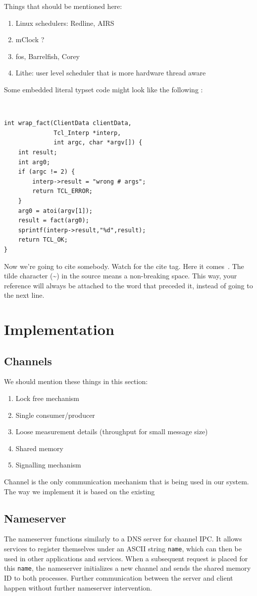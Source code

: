 \documentclass[letterpaper,twocolumn,10pt]{article}
\begin{document}
Things that should be mentioned here:
\begin{enumerate}
\item Linux schedulers: Redline, AIRS
\item mClock ?
\item fos, Barrelfish, Corey
\item Lithe: user level scheduler that is more hardware thread aware
\end{enumerate}

Some embedded literal typset code might 
look like the following :

{\tt \small
\begin{verbatim}
int wrap_fact(ClientData clientData,
              Tcl_Interp *interp,
              int argc, char *argv[]) {
    int result;
    int arg0;
    if (argc != 2) {
        interp->result = "wrong # args";
        return TCL_ERROR;
    }
    arg0 = atoi(argv[1]);
    result = fact(arg0);
    sprintf(interp->result,"%d",result);
    return TCL_OK;
}
\end{verbatim}
}

Now we're going to cite somebody.  Watch for the cite tag.
Here it comes~\cite{Chaum1981,Diffie1976}.  The tilde character (\~{})
in the source means a non-breaking space.  This way, your reference will
always be attached to the word that preceded it, instead of going to the
next line.

\section{Implementation}
\subsection{Channels}
We should mention these things in this section:
\begin{enumerate}
\item Lock free mechanism
\item Single consumer/producer
\item Loose measurement details (throughput for small message size)
\item Shared memory
\item Signalling mechanism
\end{enumerate}

Channel is the only communication mechanism that is being used in our system. The way we implement it is based on the existing 

\subsection{Nameserver} %
The nameserver functions similarly to a DNS server for channel IPC. It allows services to register themselves under an ASCII string {\tt name}, which can then be used in other applications and services. When a subsequent request is placed for this {\tt name}, the nameserver initializes a new channel and sends the shared memory ID to both processes. Further communication between the server and client happen without further nameserver intervention.
\end{document}
